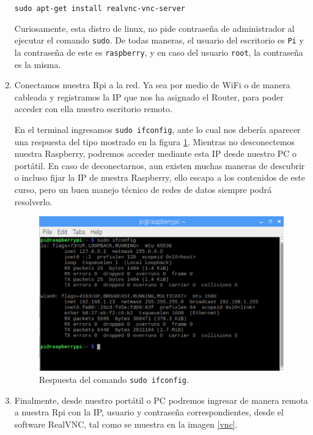 \documentclass[letterpaper, 10pt]{report}
\begin{document}
\begin{enumerate}
\begin{center}
	\texttt{sudo apt-get install realvnc-vnc-server}
\end{center} 

Curiosamente, esta distro de linux, no pide contraseña de administrador al ejecutar el comando \texttt{sudo}. De todas maneras, el usuario del escritorio es \texttt{Pi} y la contraseña de este es \texttt{raspberry}, y en caso del usuario \texttt{root}, la contraseña es la misma. 

\item Conectamos nuestra Rpi a la red. Ya sea por medio de WiFi o de manera cableada y registramos la IP que nos ha asignado el Router, para poder acceder con ella nuestro escritorio remoto.

En el terminal ingresamos \texttt{sudo ifconfig}, ante lo cual nos debería aparecer una respuesta del tipo mostrado en la figura \ref{ifconfig}. Mientras no desconectemos nuestra Raspberry, podremos acceder mediante esta IP desde nuestro PC o portátil. En caso de deconectarnos, aun existen muchas maneras de descubrir o incluso fijar la IP de nuestra Raspberry, ello escapa a los contenidos de este curso, pero un buen manejo técnico de redes de datos siempre podrá resolverlo. 

\begin{figure}[h!]
	\centering
	\includegraphics[scale=0.6]{ifconfig.png}
	\caption{Respuesta del comando \texttt{sudo ifconfig}. \label{ifconfig}}
\end{figure}


\item Finalmente, desde nuestro portátil o PC podremos ingresar de manera remota a nuestra Rpi con la IP, usuario y contraseña correspondientes, desde el software RealVNC, tal como se muestra en la imagen \ref{vnc}.


\end{enumerate}
\end{document}
